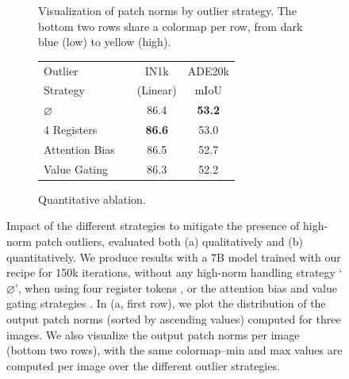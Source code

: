 \begin{figure}
\begin{subfigure}{.66\linewidth}
        \centering
        \caption{Visualization of patch norms by outlier strategy. The bottom two rows share a colormap per row, from dark blue (low) to yellow (high).}
        \label{fig:outliers-regis-attention}
    \end{subfigure}
    \hfill
    \begin{subfigure}{.33\linewidth}
        \centering
        \small
        \captionsetup{justification=centering}
        \caption{Quantitative ablation.}
        \label{tab:outliers-regis-attention}
        \addtolength{\tabcolsep}{-0.3em}
        \begin{tabular}{l c cc}
            Outlier &  & IN1k & ADE20k \\
            Strategy &  & (Linear) & mIoU \\
            \toprule
            $\varnothing$ & & 86.4 & \bf 53.2 \\
            4 Registers & & \bf 86.6 & 53.0 \\
            Attention Bias & & 86.5 & 52.7 \\
            Value Gating & & 86.3 & 52.2 \\
        \end{tabular}
        \vspace{5em}    
    \end{subfigure}
    \caption{Impact of the different strategies to mitigate the presence of high-norm patch outliers, evaluated both (a) qualitatively and (b) quantitatively. 
    We produce results with a 7B model trained with our recipe for 150k iterations, without any high-norm handling strategy `$\varnothing$', when using four register tokens \citep{darcet2024vision}, or the attention bias and value gating strategies \citep{an2025systematic}. 
    In (a, first row), we plot the distribution of the output patch norms (sorted by ascending values) computed for three images. We also visualize the output patch norms per image (bottom two rows), with the same colormap--min and max values are computed per image over the different outlier strategies. }
    \label{fig:outliers}
\end{figure}
 
